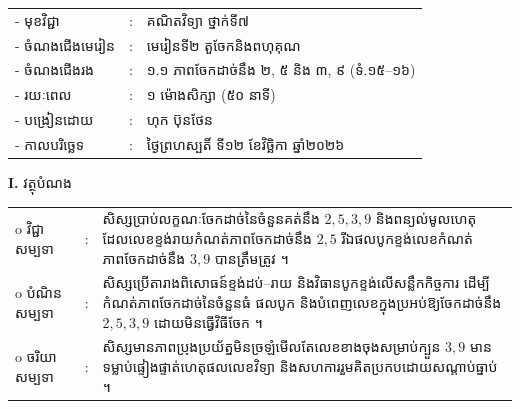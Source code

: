 \documentclass[a4paper,10pt]{article}
\newcommand{\wcirc}{{\CourierBullet\fontsize{9.5pt}{11pt}\selectfont o}}
\begin{document}
{\renewcommand{\arraystretch}{0.95}
\hspace*{4.05cm}%
\begin{tabular}{@{}l l l@{}}
  - \hspace{0.35cm} មុខវិជ្ជា & : & គណិតវិទ្យា ថ្នាក់ទី៧ \\
  - \hspace{0.35cm} ចំណងជើងមេរៀន & : & មេរៀនទី២ តួចែកនិងពហុគុណ \\
  - \hspace{0.35cm} ចំណងជើងរង & : & ១.១ ភាពចែកដាច់នឹង ២, ៥ និង ៣, ៩ (ទំ.១៥--១៦) \\
  - \hspace{0.35cm} រយៈពេល & : & ១ ម៉ោងសិក្សា (៥០ នាទី) \\
  - \hspace{0.35cm} បង្រៀនដោយ & : & ហុក ប៊ុនថែន \\
  - \hspace{0.35cm} កាលបរិច្ឆេទ & : & ថ្ងៃព្រហស្បតិ៍ ទី១២ ខែវិច្ឆិកា ឆ្នាំ២០២៦ \\
\end{tabular}

\vspace{1pt}

\textbf{I.} {\muol វត្ថុបំណង}\\[1pt]
\hspace*{0.55cm}%
\begin{tabular}{@{}l l L{14.2cm}@{}}
  \wcirc \hspace{0.25cm} វិជ្ជាសម្បទា & : & សិស្សប្រាប់លក្ខណៈចែកដាច់នៃចំនួនគត់នឹង $2, 5, 3, 9$ និងពន្យល់មូលហេតុដែលលេខខ្ទង់រាយកំណត់ភាពចែកដាច់នឹង $2, 5$ រីឯផលបូកខ្ទង់លេខកំណត់ភាពចែកដាច់នឹង $3, 9$ បានត្រឹមត្រូវ ។ \\
  \wcirc \hspace{0.25cm} បំណិនសម្បទា & : & សិស្សប្រើតារាងពិសោធន៍ខ្ទង់ដប់--រាយ និងវិធានបូកខ្ទង់លើសន្លឹកកិច្ចការ ដើម្បីកំណត់ភាពចែកដាច់នៃចំនួនធំ ផលបូក និងបំពេញលេខក្នុងប្រអប់ឱ្យចែកដាច់នឹង $2, 5, 3, 9$ ដោយមិនធ្វើវិធីចែក ។ \\
  \wcirc \hspace{0.25cm} ចរិយាសម្បទា & : & សិស្សមានភាពប្រុងប្រយ័ត្នមិនច្រឡំមើលតែលេខខាងចុងសម្រាប់ក្បួន $3, 9$ មានទម្លាប់ផ្ទៀងផ្ទាត់ហេតុផលលេខវិទ្យា និងសហការរួមគិតប្រកបដោយសណ្ដាប់ធ្នាប់ ។ \\
\end{tabular}

\vspace{1pt}

}
\end{document}

